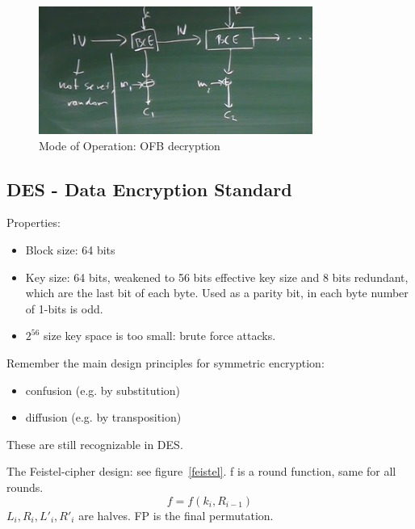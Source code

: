 \documentclass[language=english,number=]{homework}
\begin{document}
\begin{figure}
    \centering
    \includegraphics[width=\textwidth]{ofb.PNG}
    \caption{Mode of Operation: OFB decryption}
    \label{ofb}
\end{figure}

    \subsection{DES - Data Encryption Standard}

    Properties:
    \begin{itemize}
        \item Block size: 64 bits
        \item Key size: 64 bits, weakened to 56 bits effective key size and 8 bits redundant, which are the last bit of each byte.
        Used as a parity bit, in each byte number of 1-bits is odd.
        \item $2^{56}$ size key space is too small: brute force attacks.
    \end{itemize}

    Remember the main design principles for symmetric encryption:
    \begin{itemize}
        \item confusion (e.g. by substitution)
        \item diffusion (e.g. by transposition)
    \end{itemize}
    These are still recognizable in DES.

    The Feistel-cipher design: see figure~\ref{feistel}.
    f is a round function, same for all rounds.
    \[
        f = f(k_i, R_{i-1})
    \]
    $L_i,R_i,L'_{i}, R'_i$ are halves.
    FP is the final permutation.
\end{document}
